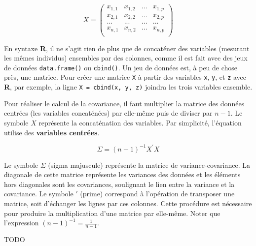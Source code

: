 \documentclass[
]{book}
\begin{document}
\[
X = \left(\begin{array}{cccc} 
x_{1,1} & x_{1,2} & ...&x_{1,p}\\
x_{2,1} & x_{2,2} & ...&x_{2,p}\\
... & ...& ...& ... \\
x_{n,1} & x_{n,2} & ... &x_{n,p}\\
\end{array}\right)
\]

En syntaxe \textbf{R}, il ne s'agit rien de plus que de concaténer des variables (mesurant les mêmes individus) ensembles par des colonnes, comme il est fait avec des jeux de données \texttt{data.frame()} ou \texttt{cbind()}. Un jeu de données est, à peu de chose près, une matrice. Pour créer une matrice \texttt{X} à partir des variables \texttt{x}, \texttt{y}, et \texttt{z} avec \textbf{R}, par exemple, la ligne \texttt{X\ =\ cbind(x,\ y,\ z)} joindra les trois variables ensemble.

Pour réaliser le calcul de la covariance, il faut multiplier la matrice des données centrées (les variables concaténées) par elle-même puis de diviser par \(n-1\). Le symbole \(X\) représente la concaténation des variables. Par simplicité, l'équation utilise des \textbf{variables centrées}.

\begin{equation}
\Sigma = (n-1)^{-1}X^\prime X
\label{eq:covmat1}
\end{equation}

Le symbole \(\Sigma\) (sigma majuscule) représente la matrice de variance-covariance. La diagonale de cette matrice représente les variances des données et les éléments hors diagonales sont les covariances, soulignant le lien entre la variance et la covariance. Le symbole \(\prime\) (prime) correspond à l'opération de transposer une matrice, soit d'échanger les lignes par ces colonnes. Cette procédure est nécessaire pour produire la multiplication d'une matrice par elle-même. Noter que l'expression \((n-1)^{-1}=\frac{1}{n-1}\).

TODO
\end{document}
